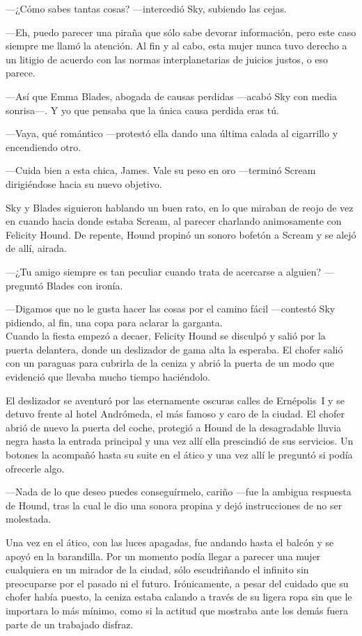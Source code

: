 ---¿Cómo sabes tantas cosas? ---intercedió Sky, subiendo las cejas.

---Eh, puedo parecer una piraña que sólo sabe devorar información, pero este caso siempre me llamó la atención. Al fin y al cabo, esta mujer nunca tuvo derecho a un litigio de acuerdo con las normas interplanetarias de juicios justos, o eso parece.

---Así que Emma Blades, abogada de causas perdidas ---acabó Sky con media sonrisa---. Y yo que pensaba que la única causa perdida eras tú.

---Vaya, qué romántico ---protestó ella dando una última calada al cigarrillo y encendiendo otro.

---Cuida bien a esta chica, James. Vale su peso en oro ---terminó Scream dirigiéndose hacia su nuevo objetivo.

Sky y Blades siguieron hablando un buen rato, en lo que miraban de reojo de vez en cuando hacia donde estaba Scream, al parecer charlando animosamente con Felicity Hound. De repente, Hound propinó un sonoro bofetón a Scream y se alejó de allí, airada.

---¿Tu amigo siempre es tan peculiar cuando trata de acercarse a alguien? ---preguntó Blades con ironía.

---Digamos que no le gusta hacer las cosas por el camino fácil ---contestó Sky pidiendo, al fin, una copa para aclarar la garganta.\\

\noindent{}Cuando la fiesta empezó a decaer, Felicity Hound se disculpó y salió por la puerta delantera, donde un deslizador de gama alta la esperaba. El chofer salió con un paraguas para cubrirla de la ceniza y abrió la puerta de un modo que evidenció que llevaba mucho tiempo haciéndolo.

El deslizador se aventuró por las eternamente oscuras calles de Ernépolis~I y se detuvo frente al hotel Andrómeda, el más famoso y caro de la ciudad. El chofer abrió de nuevo la puerta del coche, protegió a Hound de la desagradable lluvia negra hasta la entrada principal y una vez allí ella prescindió de sus servicios.
Un botones la acompañó hasta su suite en el ático y una vez allí le preguntó si podía ofrecerle algo.

---Nada de lo que deseo puedes conseguírmelo, cariño ---fue la ambigua respuesta de Hound, tras la cual le dio una sonora propina y dejó instrucciones de no ser molestada.

Una vez en el ático, con las luces apagadas, fue andando hasta el balcón y se apoyó en la barandilla. Por un momento podía llegar a parecer una mujer cualquiera en un mirador de la ciudad, sólo escudriñando el infinito sin preocuparse por el pasado ni el futuro. Irónicamente, a pesar del cuidado que su chofer había puesto, la ceniza estaba calando a través de su ligera ropa sin que le importara lo más mínimo, como si la actitud que mostraba ante los demás fuera parte de un trabajado disfraz.

